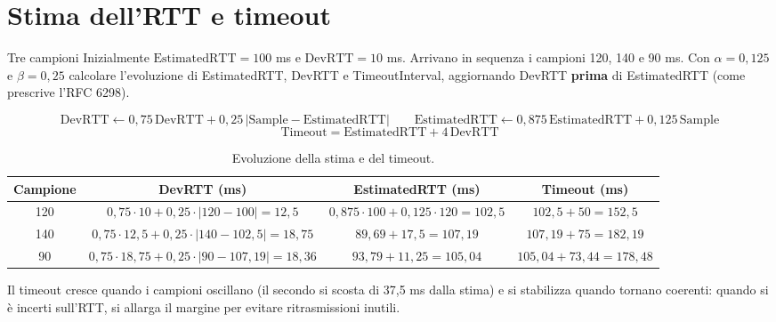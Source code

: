 \section{Stima dell'RTT e timeout}

\begin{esercizio}{Tre campioni}
Inizialmente $\text{EstimatedRTT} = 100$ ms e $\text{DevRTT} = 10$ ms. Arrivano in sequenza i campioni 120, 140 e 90 ms. Con
$\alpha = 0{,}125$ e $\beta = 0{,}25$ calcolare l'evoluzione di EstimatedRTT, DevRTT e TimeoutInterval, aggiornando DevRTT
\textbf{prima} di EstimatedRTT (come prescrive l'RFC 6298).
\end{esercizio}

\svolgimento
$$\text{DevRTT} \leftarrow 0{,}75\,\text{DevRTT} + 0{,}25\,|\text{Sample} - \text{EstimatedRTT}| \qquad
  \text{EstimatedRTT} \leftarrow 0{,}875\,\text{EstimatedRTT} + 0{,}125\,\text{Sample}$$
$$\text{Timeout} = \text{EstimatedRTT} + 4\,\text{DevRTT}$$

\begin{table}[H]
\centering
\small
\begin{tabular}{cccc}
\toprule
\textbf{Campione} & \textbf{DevRTT} (ms) & \textbf{EstimatedRTT} (ms) & \textbf{Timeout} (ms) \\
\midrule
120 & $0{,}75\cdot 10 + 0{,}25\cdot|120-100| = 12{,}5$ & $0{,}875\cdot 100 + 0{,}125\cdot 120 = 102{,}5$ & $102{,}5 + 50 = 152{,}5$ \\
140 & $0{,}75\cdot 12{,}5 + 0{,}25\cdot|140-102{,}5| = 18{,}75$ & $89{,}69 + 17{,}5 = 107{,}19$ & $107{,}19 + 75 = 182{,}19$ \\
90 & $0{,}75\cdot 18{,}75 + 0{,}25\cdot|90-107{,}19| = 18{,}36$ & $93{,}79 + 11{,}25 = 105{,}04$ & $105{,}04 + 73{,}44 = 178{,}48$ \\
\bottomrule
\end{tabular}
\caption{Evoluzione della stima e del timeout.}
\end{table}

Il timeout cresce quando i campioni oscillano (il secondo si scosta di 37,5 ms dalla stima) e si stabilizza quando tornano
coerenti: quando si è incerti sull'RTT, si allarga il margine per evitare ritrasmissioni inutili.


